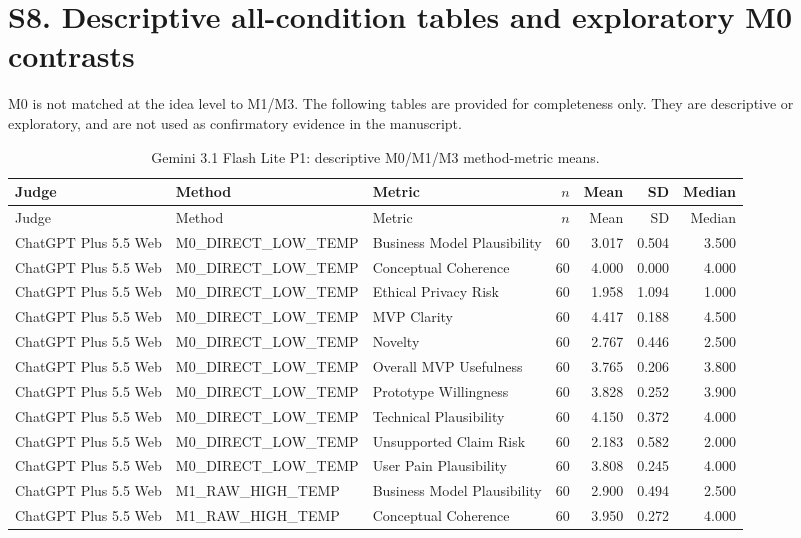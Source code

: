 \documentclass[10pt]{article}
\begin{document}
\section*{S8. Descriptive all-condition tables and exploratory M0 contrasts}
M0 is not matched at the idea level to M1/M3. The following tables are provided for
completeness only. They are descriptive or exploratory, and are not used as
confirmatory evidence in the manuscript.
\begin{landscape}
\small
\begin{longtable}{lllrrrr}
\caption{Gemini 3.1 Flash Lite P1: descriptive M0/M1/M3 method-metric means.}\label{tab:s14-method31}\\
\toprule Judge & Method & Metric & $n$ & Mean & SD & Median \\ \midrule\endfirsthead
\toprule Judge & Method & Metric & $n$ & Mean & SD & Median \\ \midrule\endhead
\bottomrule\endfoot
ChatGPT Plus 5.5 Web & M0\_DIRECT\_LOW\_TEMP & Business Model Plausibility & 60 & 3.017 & 0.504 & 3.500 \\
ChatGPT Plus 5.5 Web & M0\_DIRECT\_LOW\_TEMP & Conceptual Coherence & 60 & 4.000 & 0.000 & 4.000 \\
ChatGPT Plus 5.5 Web & M0\_DIRECT\_LOW\_TEMP & Ethical Privacy Risk & 60 & 1.958 & 1.094 & 1.000 \\
ChatGPT Plus 5.5 Web & M0\_DIRECT\_LOW\_TEMP & MVP Clarity & 60 & 4.417 & 0.188 & 4.500 \\
ChatGPT Plus 5.5 Web & M0\_DIRECT\_LOW\_TEMP & Novelty & 60 & 2.767 & 0.446 & 2.500 \\
ChatGPT Plus 5.5 Web & M0\_DIRECT\_LOW\_TEMP & Overall MVP Usefulness & 60 & 3.765 & 0.206 & 3.800 \\
ChatGPT Plus 5.5 Web & M0\_DIRECT\_LOW\_TEMP & Prototype Willingness & 60 & 3.828 & 0.252 & 3.900 \\
ChatGPT Plus 5.5 Web & M0\_DIRECT\_LOW\_TEMP & Technical Plausibility & 60 & 4.150 & 0.372 & 4.000 \\
ChatGPT Plus 5.5 Web & M0\_DIRECT\_LOW\_TEMP & Unsupported Claim Risk & 60 & 2.183 & 0.582 & 2.000 \\
ChatGPT Plus 5.5 Web & M0\_DIRECT\_LOW\_TEMP & User Pain Plausibility & 60 & 3.808 & 0.245 & 4.000 \\
ChatGPT Plus 5.5 Web & M1\_RAW\_HIGH\_TEMP & Business Model Plausibility & 60 & 2.900 & 0.494 & 2.500 \\
ChatGPT Plus 5.5 Web & M1\_RAW\_HIGH\_TEMP & Conceptual Coherence & 60 & 3.950 & 0.272 & 4.000 \\

\end{longtable}
\end{landscape}
\end{document}
